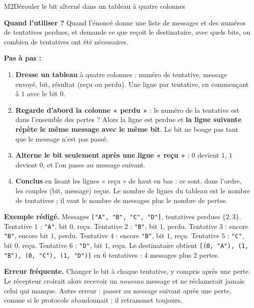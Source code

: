 \begin{fichemethode}{M2}{Dérouler le bit alterné dans un tableau à quatre colonnes}

\textbf{Quand l'utiliser ?} Quand l'énoncé donne une liste de messages et des numéros de
tentatives perdues, et demande ce que reçoit le destinataire, avec quels bits, ou combien
de tentatives ont été nécessaires.

\textbf{Pas à pas :}
\begin{enumerate}
  \item \textbf{Dresse un tableau} à quatre colonnes : numéro de tentative, message envoyé,
        bit, résultat (reçu ou perdu). Une ligne par tentative, en commençant à $1$ avec le
        bit $0$.
  \item \textbf{Regarde d'abord la colonne « perdu »} : le numéro de la tentative est dans
        l'ensemble des pertes ? Alors la ligne est perdue et \textbf{la ligne suivante répète
        le même message avec le même bit}. Le bit ne bouge pas tant que le message n'est pas
        passé.
  \item \textbf{Alterne le bit seulement après une ligne « reçu »} : $0$ devient $1$, $1$
        devient $0$, et l'on passe au message suivant.
  \item \textbf{Conclus} en lisant les lignes « reçu » de haut en bas : ce sont, dans
        l'ordre, les couples (bit, message) reçus. Le nombre de lignes du tableau est le
        nombre de tentatives ; il vaut le nombre de messages plus le nombre de pertes.
\end{enumerate}

\textbf{Exemple rédigé.} Messages \lstinline{["A", "B", "C", "D"]}, tentatives perdues
$\{2, 3\}$. Tentative $1$ : \lstinline{"A"}, bit $0$, reçu. Tentative $2$ : \lstinline{"B"},
bit $1$, perdu. Tentative $3$ : encore \lstinline{"B"}, encore bit $1$, perdu. Tentative $4$ :
encore \lstinline{"B"}, bit $1$, reçu. Tentative $5$ : \lstinline{"C"}, bit $0$, reçu.
Tentative $6$ : \lstinline{"D"}, bit $1$, reçu. Le destinataire obtient
\lstinline{[(0, "A"), (1, "B"), (0, "C"), (1, "D")]} en $6$ tentatives : $4$ messages plus
$2$ pertes.

\textbf{Erreur fréquente.} Changer le bit à chaque tentative, y compris après une perte.
Le récepteur croirait alors recevoir un \emph{nouveau} message et ne réclamerait jamais celui
qui manque. Autre erreur : passer au message suivant après une perte, comme si le protocole
abandonnait ; il retransmet toujours.

\end{fichemethode}
